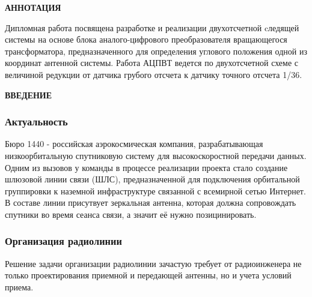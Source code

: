 \newpage
\begin{center}
  \textbf{\large АННОТАЦИЯ}
\end{center}

Дипломная работа посвящена разработке и реализации двухотсчетной cледящей системы на основе блока аналого-цифрового преобразователя вращающегося трансформатора, 
предназначенного для определения углового положения одной из координат антенной системы. Работа АЦПВТ ведется по двухотсчетной схеме 
с величиной редукции от датчика грубого отсчета к датчику точного отсчета 1/36.


\onehalfspacing
\setcounter{page}{2}

\newpage
\renewcommand{\contentsname}{\centerline{\large СОДЕРЖАНИЕ}}
\tableofcontents

\newpage
\begin{center}
  \textbf{\large ВВЕДЕНИЕ}
\end{center}


\subsubsection{Актуальность} 

Бюро 1440 - российская аэрокосмическая компания, разрабатывающая низкоорбитальную спутниковую систему для высокоскоростной передачи данных. 
Одним из вызовов у команды в процессе реализации проекта стало создание шлюзовой линии связи (ШЛС), 
предназначенной для подключения орбитальной группировки к наземной инфраструктуре связанной с всемирной сетью Интернет. 
В составе линии присутвует зеркальная антенна, которая должна сопровождать спутники во время сеанса связи, а значит её нужно позицинировать.

\subsubsection{Организация радиолинии}

Решение задачи организации радиолинии зачастую требует от радиоинженера не только проектирования приемной и передающей антенны, но и учета условий приема. 


